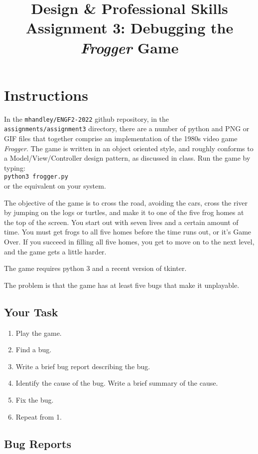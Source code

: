 \documentclass{article}
\title{Design \& Professional Skills\\
  Assignment 3: Debugging the {\em Frogger} Game}
\author{}
\date{}
\begin{document}
\maketitle

\section*{Instructions}

In the {\tt mhandley/ENGF2-2022} github repository, in the \\
{\tt assignments/assignment3} directory, there are a number of python and
PNG or GIF files that together comprise an implementation of the 1980s video
game \textit{Frogger}.  The game is written in an object oriented
style, and roughly conforms to a Model/View/Controller design pattern,
as discussed in class.  Run the game by typing:\\ \texttt{python3
  frogger.py}\\ or the equivalent on your system.  

The objective of the game is to cross the road, avoiding the cars,
cross the river by jumping on the logs or turtles, and make it to one
of the five frog homes at the top of the screen.  You start out with
seven lives and a certain amount of time.  You must get frogs to all
five homes before the time runs out, or it's Game Over.  If you
succeed in filling all five homes, you get to move on to the next
level, and the game gets a little harder.

The game requires python 3 and a recent version of tkinter.

The problem is that the game has at least five bugs that make it unplayable.
\subsection*{Your Task}
\begin{enumerate}
\item Play the game.
\item Find a bug.
\item Write a brief bug report describing the bug.
\item Identify the cause of the bug.  Write a brief summary of the cause.
\item Fix the bug.
\item Repeat from 1.
\end{enumerate}
\newpage
\subsection*{Bug Reports}
\end{document}
